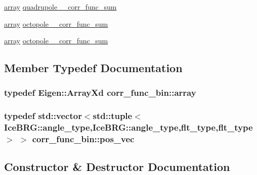 \begin{DoxyCompactItemize}
\item 
\hyperlink{structcorr__func__bin_a266e654606807bf423b915c6ef9ff7ab}{array} \hyperlink{structcorr__func__bin_a3b61d1f4b48cb5a55ba3486bdfd0da2d}{quadrupole\+\_\+\_\+corr\+\_\+func\+\_\+sum}
\item 
\hyperlink{structcorr__func__bin_a266e654606807bf423b915c6ef9ff7ab}{array} \hyperlink{structcorr__func__bin_a56b3e2512c17dcdbdbb2c580ffc2edcf}{octopole\+\_\+\_\+corr\+\_\+func\+\_\+sum}
\item 
\hyperlink{structcorr__func__bin_a266e654606807bf423b915c6ef9ff7ab}{array} \hyperlink{structcorr__func__bin_ae880521104f5c188a992c2b2b1359591}{octopole\+\_\+\_\+corr\+\_\+func\+\_\+sum}
\end{DoxyCompactItemize}


\subsection{Member Typedef Documentation}
\hypertarget{structcorr__func__bin_a266e654606807bf423b915c6ef9ff7ab}{}
\subsubsection[{array}]{\setlength{\rightskip}{0pt plus 5cm}typedef Eigen\+::\+Array\+Xd {\bf corr\+\_\+func\+\_\+bin\+::array}}\label{structcorr__func__bin_a266e654606807bf423b915c6ef9ff7ab}
\hypertarget{structcorr__func__bin_a683c7075740b3dcae9ebb1ac758c0bfa}{}
\subsubsection[{pos\+\_\+vec}]{\setlength{\rightskip}{0pt plus 5cm}typedef std\+::vector$<$std\+::tuple$<${\bf Ice\+B\+R\+G\+::angle\+\_\+type},{\bf Ice\+B\+R\+G\+::angle\+\_\+type},{\bf flt\+\_\+type},{\bf flt\+\_\+type}$>$ $>$ {\bf corr\+\_\+func\+\_\+bin\+::pos\+\_\+vec}}\label{structcorr__func__bin_a683c7075740b3dcae9ebb1ac758c0bfa}


\subsection{Constructor \& Destructor Documentation}
\hypertarget{structcorr__func__bin_a32ec71e0d9ae366bc3b103260e662567}{}
